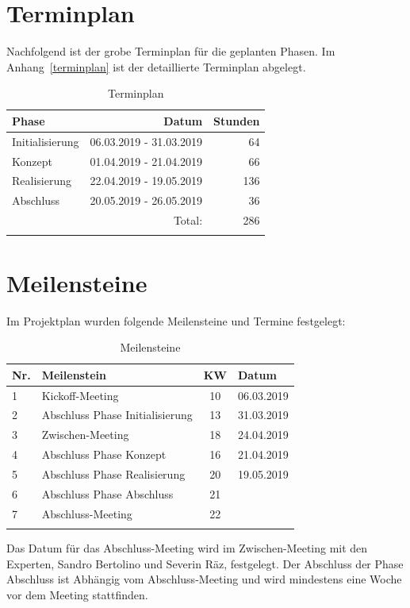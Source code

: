 
\clearpage
\section{Terminplan}

Nachfolgend ist der grobe Terminplan für die geplanten Phasen. Im Anhang~\ref{terminplan} ist
der detaillierte Terminplan abgelegt.

\begin{longtable}[]{@{}lrr@{}}
  \toprule
  Phase           & Datum                   & Stunden\tabularnewline
  \midrule
  \endhead
  Initialisierung & 06.03.2019 - 31.03.2019 & 64\tabularnewline
  Konzept         & 01.04.2019 - 21.04.2019 & 66\tabularnewline
  Realisierung    & 22.04.2019 - 19.05.2019 & 136\tabularnewline
  Abschluss       & 20.05.2019 - 26.05.2019 & 36\tabularnewline
  \midrule
                  & Total:                  & 286\tabularnewline
  \bottomrule
  \caption{Terminplan}
\end{longtable}


\section{Meilensteine}\label{meilensteine}

Im Projektplan wurden folgende Meilensteine und Termine festgelegt:

\begin{longtable}[]{@{}llcl@{}}
  \toprule
  Nr. & Meilenstein                     & KW & Datum\tabularnewline
  \midrule
  \endhead
  1   & Kickoff-Meeting                 & 10 & 06.03.2019\tabularnewline
  2   & Abschluss Phase Initialisierung & 13 & 31.03.2019\tabularnewline
  3   & Zwischen-Meeting                & 18 & 24.04.2019\tabularnewline
  4   & Abschluss Phase Konzept         & 16 & 21.04.2019\tabularnewline
  5   & Abschluss Phase Realisierung    & 20 & 19.05.2019\tabularnewline
  6   & Abschluss Phase Abschluss       & 21 & \tabularnewline
  7   & Abschluss-Meeting               & 22 & \tabularnewline
  \bottomrule
  \caption{Meilensteine}
\end{longtable}

Das Datum für das Abschluss-Meeting wird im Zwischen-Meeting mit den Experten, Sandro Bertolino und Severin Räz, festgelegt. Der Abschluss der Phase Abschluss ist Abhängig vom Abschluss-Meeting und wird mindestens eine Woche vor dem Meeting stattfinden.

